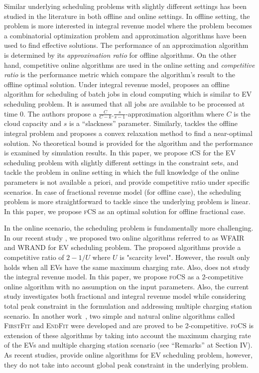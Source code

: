 \documentclass[journal]{IEEEtran}
\newcommand{\bt}[1]{{\color{blue}#1}}%
\newcommand{\bt}[1]{#1}
\newcommand{\ics}{\textsc{iCS}\xspace}
\newcommand{\fcs}{\textsc{fCS}\xspace}
\newcommand{\focs}{\textsc{foCS}\xspace}
\begin{document}
\bt{
	Similar underlying scheduling problems with slightly different settings has been studied in the literature in both offline and online settings. In offline setting, the problem is more interested in integral revenue model where the problem becomes a combinatorial optimization problem and approximation algorithms have been used to find effective solutions. 
The performance of an approximation algorithm is determined by its \emph{approximation ratio} for offline 
algorithms. On the other hand, competitive online algorithms are used in the online setting and \emph{competitive ratio} is the performance metric which compare the algorithm's result to the offline optimal solution. 
Under integral revenue model, \cite{jain2015near} proposes an offline algorithm for scheduling of batch jobs in cloud computing which is similar to EV scheduling problem. It is assumed that all jobs are available to be processed at time 0. The authors propose a $\frac{C}{C-k}.\frac{s}{s-1}$-approximation algorithm where $C$ is the cloud capacity and $s$ is a ``slackness'' parameter. 
Similarly, \cite{yao2016real} tackles the offline integral problem and proposes a convex relaxation method to find a near-optimal solution. No theoretical bound is provided for the algorithm and the performance is examined by simulation results. In this paper, we propose \ics for the EV scheduling problem with slightly different settings in the constraint sets, and tackle the problem in online setting in which the full knowledge of the online parameters is not available a priori, and provide competitive ratio under specific scenarios. 
In case of fractional revenue model (for offline case), the scheduling problem is more straightforward to tackle since the underlying problem is linear. In this paper, we propose \fcs as an optimal solution for offline fractional case. 

In the online scenario, the scheduling problem is fundamentally more challenging. In our recent study \cite{alinia2018competitive}, 
we proposed two online algorithms referred to as WFAIR and WRAND for EV scheduling problem. The proposed algorithms provide a competitive ratio of $2-1/U$ where $U$ is "scarcity level". However, \cite{alinia2018competitive} the result only holds when all EVs have the same maximum charging rate. Also, \cite{alinia2018competitive} does not study the integral revenue model. In this paper, we propose \focs as a 2-competitive online algorithm with no assumption on the input parameters. Also, the current study investigates both fractional and integral revenue model while considering total peak constraint in the formulation and addressing multiple charging station scenario. 
In another work~\cite{firstfit}, two simple and natural online algorithms called \textsc{FirstFit} and \textsc{EndFit} were developed and are proved to be 2-competitive. \focs is extension of these algorithms by taking into account the maximum charging rate of the EVs and multiple charging station scenario (see ``Remarks'' at Section IV). As recent studies, \cite{zheng2016online,deng2016whether} provide online algorithms for EV scheduling problem, however, they do not take into account global peak constraint in the underlying problem. 

}
\end{document}
